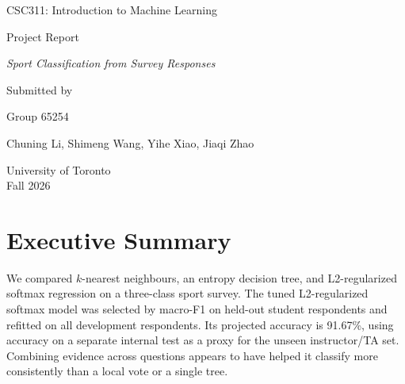 \documentclass[12pt]{article}
\begin{document}
\begin{titlepage}
    \centering
    \vspace*{3cm}

    {\Large {CSC311: Introduction to Machine Learning} \par}
    \vspace{1cm}

    {\Large {Project Report} \par}
    \vspace{1cm}

    {\large \textit{Sport Classification from Survey Responses} \par}
    \vspace{3cm}

    {\large Submitted by \par}

    \vspace{0.5cm}
    {\large Group 65254}

    \vspace{0.5cm}
    {\large Chuning Li, Shimeng Wang, Yihe Xiao, Jiaqi Zhao \par}

    \vfill
    {\large University of Toronto \\ Fall 2026 \par}
\end{titlepage}
\clearpage
\setcounter{page}{1}

\section{Executive Summary}

We compared $k$-nearest neighbours, an entropy decision tree, and
L2-regularized softmax regression on a three-class sport survey. The tuned
L2-regularized softmax model was selected by macro-F1 on held-out student
respondents and refitted on all development respondents. Its projected
accuracy is 91.67\%, using accuracy on a separate internal test as a proxy for
the unseen instructor/TA set. Combining evidence across questions appears to
have helped it classify more consistently than a local vote or a single tree.

\end{document}
